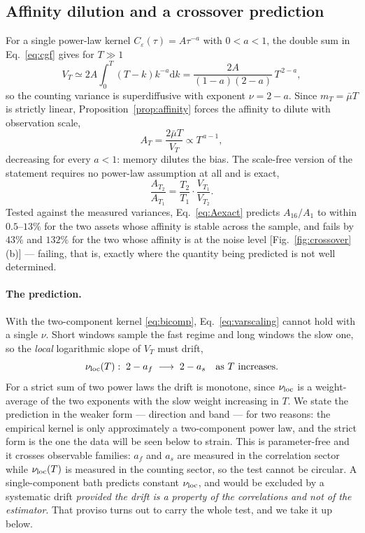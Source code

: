 \documentclass[aps,pre,twocolumn,superscriptaddress,floatfix,nofootinbib]{revtex4-2}
\newcommand{\eps}{\varepsilon}
\newcommand{\dd}{\mathrm{d}}
\begin{document}
\subsection{Affinity dilution and a crossover prediction}
\label{sec:crossover}

For a single power-law kernel $C_\eps(\tau)=A\tau^{-a}$ with $0<a<1$, the double
sum in Eq.~\eqref{eq:cgf} gives for $T\gg1$
\begin{equation}
  V_T\simeq2A\!\int_0^T\!(T-k)k^{-a}\dd k=\frac{2A}{(1-a)(2-a)}\,T^{\,2-a} ,
  \label{eq:varscaling}
\end{equation}
so the counting variance is superdiffusive with exponent $\nu=2-a$. Since
$m_T=\bar\mu T$ is strictly linear, Proposition~\ref{prop:affinity} forces the
affinity to dilute with observation scale,
\begin{equation}
  A_T=\frac{2\bar\mu T}{V_T}\propto T^{\,a-1} ,
\end{equation}
decreasing for every $a<1$: memory dilutes the bias. The scale-free version of
the statement requires no power-law assumption at all and is exact,
\begin{equation}
  \frac{A_{T_2}}{A_{T_1}}=\frac{T_2}{T_1}\cdot\frac{V_{T_1}}{V_{T_2}} .
  \label{eq:Aexact}
\end{equation}
Tested against the measured variances, Eq.~\eqref{eq:Aexact} predicts
$A_{16}/A_1$ to within $0.5$--$13\%$ for the two assets whose affinity is stable
across the sample, and fails by $43\%$ and $132\%$ for the two whose affinity
is at the noise level [Fig.~\ref{fig:crossover}(b)] --- failing, that is,
exactly where the quantity being predicted is not well determined.

\paragraph*{The prediction.} With the two-component kernel \eqref{eq:bicomp},
Eq.~\eqref{eq:varscaling} cannot hold with a single $\nu$. Short windows sample
the fast regime and long windows the slow one, so the \emph{local} logarithmic
slope of $V_T$ must drift,
\begin{equation}
  \nu_{\rm loc}(T):\; 2-a_f\;\longrightarrow\;2-a_s
  \quad\text{as } T \text{ increases.}
  \label{eq:crossover}
\end{equation}
For a strict sum of two power laws the drift is monotone, since $\nu_{\rm loc}$
is a weight-average of the two exponents with the slow weight increasing in
$T$. We state the prediction in the weaker form --- direction and band --- for
two reasons: the empirical kernel is only approximately a two-component power
law, and the strict form is the one the data will be seen below to strain.
This is parameter-free and it crosses observable families: $a_f$ and $a_s$ are
measured in the correlation sector while $\nu_{\rm loc}(T)$ is measured in the
counting sector, so the test cannot be circular. A single-component bath
predicts constant $\nu_{\rm loc}$, and would be excluded by a systematic drift
\emph{provided the drift is a property of the correlations and not of the
estimator}. That proviso turns out to carry the whole test, and we take it up
below.
\end{document}
